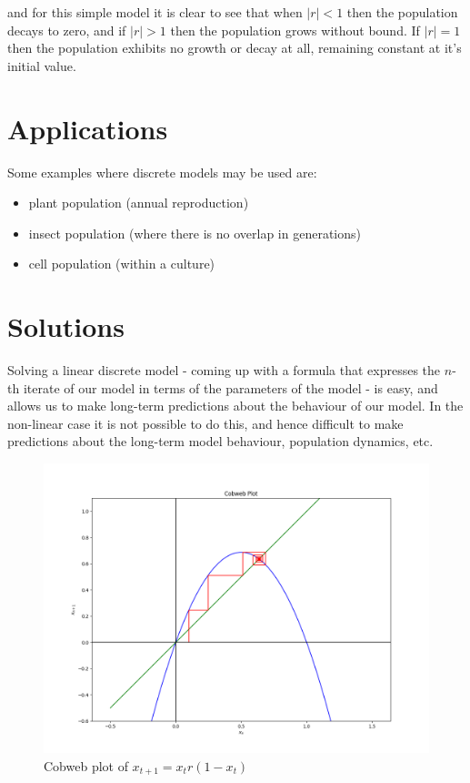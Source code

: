 \documentclass{report}
\begin{document}
and for this simple model it is clear to see that when $\left| r \right| < 1$ then the population decays to zero,
and if $\left| r \right| > 1$ then the population grows without bound. If $\left| r \right| = 1$ then the
population exhibits no growth or decay at all, remaining constant at it's initial value. \bigskip




\section{Applications}

Some examples where discrete models may be used are: \bigskip

\begin{itemize}
	\item plant population (annual reproduction)
	\item insect population (where there is no overlap in generations)
	\item cell population (within a culture)
\end{itemize}\medskip




\section{Solutions}

Solving a linear discrete model - coming up with a formula that expresses the $n$-th
iterate of our model in terms of the parameters of the model - is easy, and allows us
to make long-term predictions about the behaviour of our model. In the non-linear case
it is not possible to do this, and hence difficult to make predictions about the
long-term model behaviour, population dynamics, etc. \bigskip

\begin{figure}[h]
	\centering
	\includegraphics[scale = 0.4]{cobweb_01}
	\caption{Cobweb plot of $x_{t + 1} = x_t r (1 - x_t)$}
	\label{fig:cobweb_01}
\end{figure}\medskip
\end{document}
